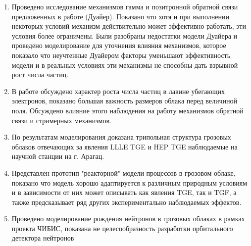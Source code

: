 \begin{enumerate}
  \item Проведено исследование механизмов гамма и позитронной обратной связи предложенных в работе (Дуайер). Показано что хотя и при выполнении некоторых условий механизм действительно может эффективно работать, эти условия более ограничены. Были разобраны недостатки модели Дуайера и проведено моделирование для уточнения влияния механизмов, которое показало что неучтенные Дуайером факторы уменьшают эффективность модели и в реальных условиях эти механизмы не способны дать взрывной рост числа частиц.
  \item В работе обсуждено характер роста числа частиц в лавине убегающих электронов, показано большая важность размеров облака перед величиной поля. Обсуждено влияние этого наблюдения на работу механизмов обратной связи и стримерных механизмов.
  \item По результатам моделирования доказана трипольная структура грозовых облаков отвечающих за явления LLLE TGE и HEP TGE наблюдаемые на научной станции на г. Арагац.
  \item Представлен прототип "реакторной" модели процессов в грозовом облаке, показано что модель хорошо адаптируется к различным природным условиям и в зависимости от них может описывать как явления TGE, так и TGF, а также предсказывает ряд других экспериментально наблюдаемых эффектов. 
  \item Проведено моделирование рождения нейтронов в грозовых облаках в рамках проекта ЧИБИС, показана не целесообразность разработки орбитального детектора нейтронов
\end{enumerate}
